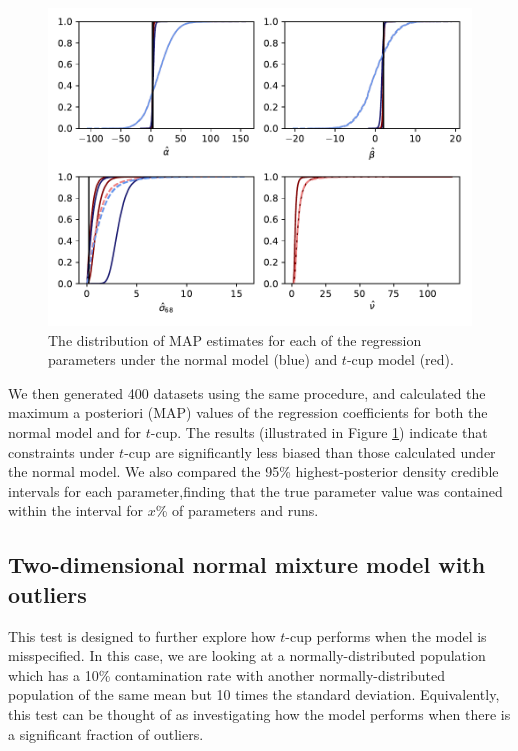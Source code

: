 \documentclass[fleqn,usenatbib]{rasti}
\begin{document}
\begin{figure}
    \includegraphics[width=\columnwidth]{graphics/fixed/outlier_cdf.pdf}
    \caption{The distribution of MAP estimates for each
    of the regression parameters under the normal model (blue) and $t$-cup model
    (red).}
    \label{fig:results.outlier.map}
\end{figure}

We then generated 400 datasets using the same procedure, and calculated the
maximum a posteriori (MAP) values of the regression coefficients for both the
normal model and for $t$-cup. The results (illustrated in Figure
\ref{fig:results.outlier.map}) indicate that {\color{red} constraints under
$t$-cup are significantly less biased than those calculated under the normal
model. We also compared the 95\% highest-posterior density credible intervals
for each parameter,finding that the true parameter value was contained within
the interval for $x$\% of parameters and runs. }


\subsection{Two-dimensional normal mixture model with outliers}
\label{sec:results.gmm}

This test is designed to further explore how $t$-cup performs when the model is
misspecified. In this case, we are looking at a normally-distributed population
which has a 10\% contamination rate with another normally-distributed population
of the same mean but 10 times the standard deviation. Equivalently, this test
can be thought of as investigating how the model performs when there is a
significant fraction of outliers.
\end{document}
